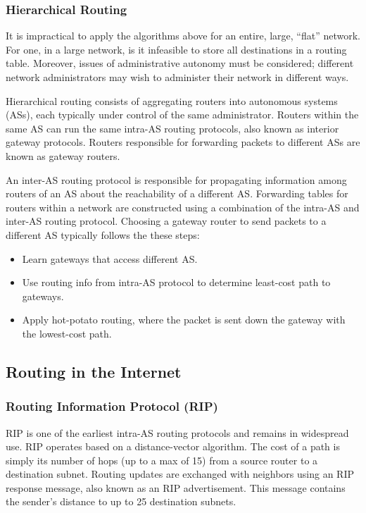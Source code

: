 \documentclass[12pt,titlepage]{article}
\begin{document}
      \subsubsection{Hierarchical Routing}
        It is impractical to apply the algorithms above for an entire, large, ``flat'' network. For one, in a large network, is it infeasible to store
        all destinations in a routing table. Moreover, issues of administrative autonomy must be considered; different network administrators may wish
        to administer their network in different ways.

        Hierarchical routing consists of aggregating routers into autonomous systems (ASs), each typically under control of the same administrator.
        Routers within the same AS can run the same intra-AS routing protocols, also known as interior gateway protocols. Routers responsible for
        forwarding packets to different ASs are known as gateway routers.

        An inter-AS routing protocol is responsible for propagating information among routers of an AS about the reachability of a different AS.
        Forwarding tables for routers within a network are constructed using a combination of the intra-AS and inter-AS routing protocol. Choosing
        a gateway router to send packets to a different AS typically follows the these steps:
        \begin{itemize}
          \item Learn gateways that access different AS.
          \item Use routing info from intra-AS protocol to determine least-cost path to gateways.
          \item Apply hot-potato routing, where the packet is sent down the gateway with the lowest-cost path.
        \end{itemize}

    \subsection{Routing in the Internet}

      \subsubsection{Routing Information Protocol (RIP)}
        RIP is one of the earliest intra-AS routing protocols and remains in widespread use. RIP operates based on a distance-vector algorithm.
        The cost of a path is simply its number of hops (up to a max of 15) from a source router to a destination subnet. Routing updates are
        exchanged with neighbors using an RIP response message, also known as an RIP advertisement. This message contains the sender's distance
        to up to 25 destination subnets.
\end{document}
